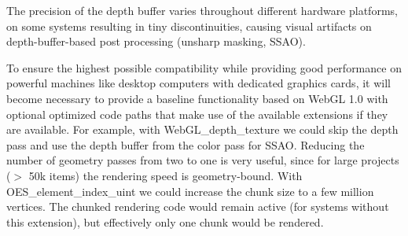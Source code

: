 \documentclass[annual]{acmsiggraph}
\begin{document}
The precision of the depth buffer varies throughout different hardware platforms, on some systems resulting in tiny discontinuities, causing visual artifacts on depth-buffer-based post processing (unsharp masking, SSAO).

To ensure the highest possible compatibility while providing good performance on powerful machines like desktop computers with dedicated graphics cards, it will become necessary to provide a baseline functionality based on WebGL 1.0 with optional optimized code paths that make use of the available extensions if they are available.
For example, with WebGL\_depth\_texture we could skip the depth pass and use the depth buffer from the color pass for SSAO.
Reducing the number of geometry passes from two to one is very useful, since for large projects ($>$ 50k items) the rendering speed is geometry-bound.
With OES\_element\_index\_uint we could increase the chunk size to a few million vertices.
The chunked rendering code would remain active (for systems without this extension), but effectively only one chunk would be rendered.
\end{document}
